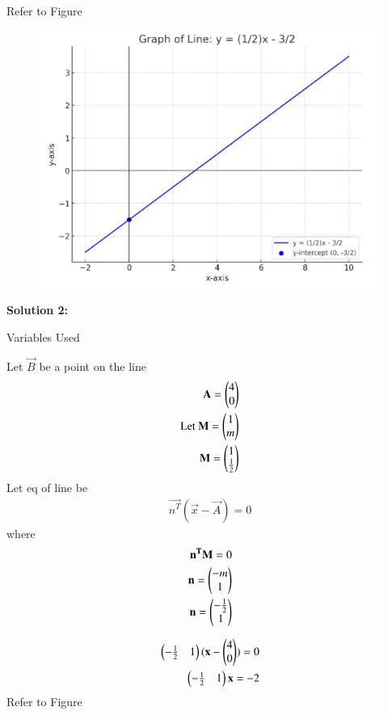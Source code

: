 \documentclass[journal]{IEEEtran}
\begin{document}
Refer to Figure

\begin{figure}[H]
\begin{center}
\includegraphics[width=0.6\columnwidth]{figs/grapha.png}
\end{center}
\caption{}
\label{fig:Fig}
\end{figure}
\textbf{Solution 2: }
\begin{table}[H]    
  \centering
  
  \caption{Variables Used}
  \label{tab:4.3.492}
\end{table}
Let $\vec{B}$ be a point on the line 
\begin{align}
\mathbf{A}=\begin{pmatrix}
                4
                \\
                 0  \end{pmatrix}\\
\text{Let }\mathbf{M}=\begin{pmatrix}
                           1
                           \\
                            m
                            \end{pmatrix}\\
            \mathbf{M}=\begin{pmatrix}
                           1
                           \\
                            \frac{1}{2}
                            \end{pmatrix}
\end{align}
Let eq of line be
\begin{align}
\vec{n^T}(\vec{x}-\vec{A})=0
\end{align}
where 
\begin{align}
\mathbf{n^T}\mathbf{M}=0\\
\mathbf{n}=\begin{pmatrix}-m
               \\ 
               1\end{pmatrix}\\
\mathbf{n}=\begin{pmatrix}-\frac{1}{2}
               \\ 
               1\end{pmatrix}
\end{align}

\begin{align}
\begin{pmatrix}-\frac{1}{2}& 1 \end{pmatrix}
(\mathbf{x}-    
\begin{pmatrix}
           4
           \\
            0
               \end{pmatrix})
= 0\\
\begin{pmatrix}-\frac{1}{2}&1\end{pmatrix}\mathbf{x}
=-2
\end{align}
Refer to Figure
\end{document}

